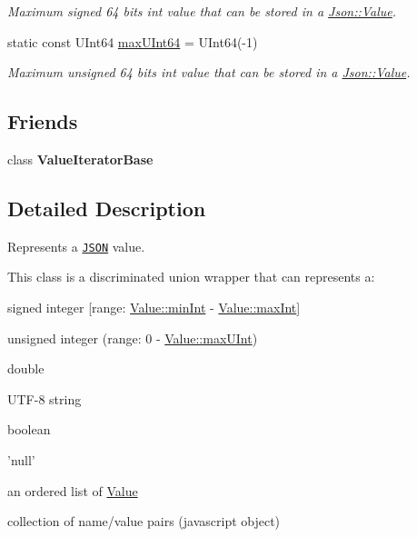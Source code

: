 \begin{DoxyCompactItemize}
\begin{DoxyCompactList}\small\item\em Maximum signed 64 bits int value that can be stored in a \hyperlink{class_json_1_1_value}{Json\-::\-Value}. \end{DoxyCompactList}\item 
\hypertarget{class_json_1_1_value_ae1eb89c305c39516696ff305cffa01da}{static const U\-Int64 \hyperlink{class_json_1_1_value_ae1eb89c305c39516696ff305cffa01da}{max\-U\-Int64} = U\-Int64(-\/1)}\label{class_json_1_1_value_ae1eb89c305c39516696ff305cffa01da}

\begin{DoxyCompactList}\small\item\em Maximum unsigned 64 bits int value that can be stored in a \hyperlink{class_json_1_1_value}{Json\-::\-Value}. \end{DoxyCompactList}\end{DoxyCompactItemize}
\subsection*{Friends}
\begin{DoxyCompactItemize}
\item 
\hypertarget{class_json_1_1_value_ad016df56489e5d360735457afba2f649}{class {\bfseries Value\-Iterator\-Base}}\label{class_json_1_1_value_ad016df56489e5d360735457afba2f649}

\end{DoxyCompactItemize}


\subsection{Detailed Description}
Represents a \href{http://www.json.org}{\tt J\-S\-O\-N} value. 

This class is a discriminated union wrapper that can represents a\-:
\begin{DoxyItemize}
\item signed integer \mbox{[}range\-: \hyperlink{class_json_1_1_value_a7df8a39e2502b8c92a6a41e3d752d2c8}{Value\-::min\-Int} -\/ \hyperlink{class_json_1_1_value_a978c799a8af3114ef7dab6fd0a310a1b}{Value\-::max\-Int}\mbox{]}
\item unsigned integer (range\-: 0 -\/ \hyperlink{class_json_1_1_value_ac79e63ee68d3aa914bfd6988be669b87}{Value\-::max\-U\-Int})
\item double
\item U\-T\-F-\/8 string
\item boolean
\item 'null'
\item an ordered list of \hyperlink{class_json_1_1_value}{Value}
\item collection of name/value pairs (javascript object)
\end{DoxyItemize}


